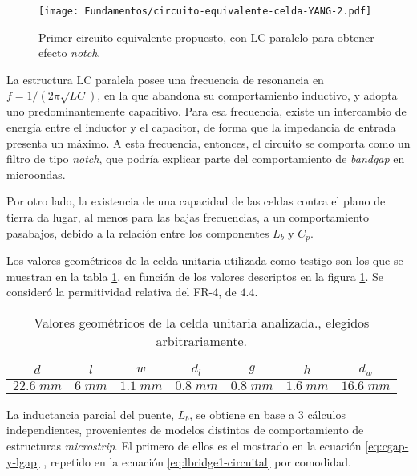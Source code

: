 \begin{figure}[h]
	\centering
	\texttt{[image: Fundamentos/circuito-equivalente-celda-YANG-2.pdf]}
	\caption{Primer circuito equivalente propuesto, con LC paralelo para obtener efecto \textit{notch}.}
	\label{fig:primerCircuitoPropuesto}
\end{figure}

La estructura LC paralela posee una frecuencia de resonancia en $f=1/(2 \pi \sqrt{LC})$, en la que abandona su comportamiento inductivo, y adopta uno predominantemente capacitivo. Para esa frecuencia, existe un intercambio de energía entre el inductor y el capacitor, de forma que la impedancia de entrada presenta un máximo. A esta frecuencia, entonces, el circuito se comporta como un filtro de tipo \textit{notch}, que podría explicar parte del comportamiento de \textit{bandgap} en microondas.

Por otro lado, la existencia de una capacidad de las celdas contra el plano de tierra da lugar, al menos para las bajas frecuencias, a un comportamiento pasabajos, debido a la relación entre los componentes $L_b$ y $C_p$.

Los valores geométricos de la celda unitaria utilizada como testigo son los que se muestran en la tabla \ref{table:CeldaUnitariaAnalisisiCircuital}, en función de los valores descriptos en la figura \ref{fig:primerCircuitoPropuesto}. Se consideró la permitividad relativa del FR-4, de $4.4$.

\begin{table}
	\centering
	\begin{tabular}{|c|c|c|c|c|c|c|}
		
		\hline
		$d$ & $l$ & $w$ & $d_l$ & $g$ & $h$ & $d_w$\\ 
		\hline
		$22.6\;mm$ & $6\;mm$ & $1.1\;mm$ & $0.8\;mm$ & $0.8\;mm$ & $1.6\;mm$ & $16.6\;mm$\\ 
		\hline 
	\end{tabular}
	\caption{Valores geométricos de la celda unitaria analizada., elegidos arbitrariamente.}
	\label{table:CeldaUnitariaAnalisisiCircuital}
\end{table}

La inductancia parcial del puente, $L_b$, se obtiene en base a 3 cálculos independientes, provenientes de modelos distintos de comportamiento de estructuras \textit{microstrip}. El primero de ellos es el mostrado en la ecuación \ref{eq:cgap-y-lgap} \cite{KimSchuttAine:AnalysisHybrid}, repetido en la ecuación \ref{eq:lbridge1-circuital} por comodidad.

